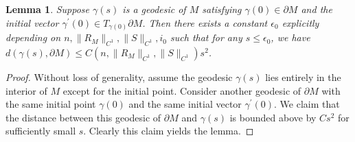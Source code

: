 \documentclass[11pt,letterpaper]{amsart}
\numberwithin{equation}{section}
\theoremstyle{definition}
\theoremstyle{plain}
\theoremstyle{definition}
\theoremstyle{plain}
\theoremstyle{definition}
\theoremstyle{plain}
\newtheorem{geodiff}[riccati]{Lemma}
\begin{document}
\begin{geodiff}\label{geodiff}
Suppose $\gamma(s)$ is a geodesic of $M$ satisfying $\gamma(0)\in \partial M$ and the initial vector $\gamma^{\prime}(0)\in T_{\gamma(0)}\partial M$. Then there exists a constant $\epsilon_0$ explicitly depending on $n,\|R_M\|_{C^1},\|S\|_{C^1},i_0$ such that for any $s\leqslant \epsilon_0$, we have $d(\gamma(s),\partial M) \leqslant C(n,\|R_M\|_{C^1},\|S\|_{C^1})s^2$.
\end{geodiff}

\begin{proof}
Without loss of generality, assume the geodesic $\gamma(s)$ lies entirely in the interior of $M$ except for the initial point. 
Consider another geodesic of $\partial M$ with the same initial point $\gamma(0)$ and the same initial vector $\gamma^{\prime}(0)$. We claim that the distance between this geodesic of $\partial M$ and $\gamma(s)$ is bounded above by $Cs^2$ for sufficiently small $s$. Clearly this claim yields the lemma.


\end{proof}
\end{document}
